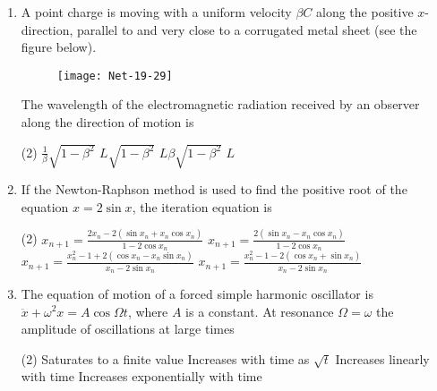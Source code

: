 \begin{enumerate}
 \begin{tasks}(4)
	\task[\textbf{a.}]$-2 \alpha$ and $\alpha$
	\task[\textbf{b.}] $2 \alpha$ and $-\alpha$
	\task[\textbf{c.}] $\alpha$ and $-2 \alpha$
	\task[\textbf{d.}] $-\alpha$ and $2 \alpha$
\end{tasks}
\item  A point charge is moving with a uniform velocity $\beta C$ along the positive $x$-direction, parallel to and very close to a corrugated metal sheet (see the figure below).
\begin{figure}[H]
	\centering
	\texttt{[image: Net-19-29]}
\end{figure}
The wavelength of the electromagnetic radiation received by an observer along the direction of motion is
 \begin{tasks}(2)
	\task[\textbf{a.}]$\frac{1}{\beta} \sqrt{1-\beta^{2}}$
	\task[\textbf{b.}]$L \sqrt{1-\beta^{2}}$
	\task[\textbf{c.}]$L \beta \sqrt{1-\beta^{2}}$
	\task[\textbf{d.}] $L$
\end{tasks}
\item If the Newton-Raphson method is used to find the positive root of the equation $x=2 \sin x$, the iteration equation is
 \begin{tasks}(2)
	\task[\textbf{a.}]$x_{n+1}=\frac{2 x_{n}-2\left(\sin x_{n}+x_{n} \cos x_{n}\right)}{1-2 \cos x_{n}}$
	\task[\textbf{b.}]$x_{n+1}=\frac{2\left(\sin x_{n}-x_{n} \cos x_{n}\right)}{1-2 \cos x_{n}}$
	\task[\textbf{c.}] $x_{n+1}=\frac{x_{n}^{2}-1+2\left(\cos x_{n}-x_{n} \sin x_{n}\right)}{x_{n}-2 \sin x_{n}}$
	\task[\textbf{d.}]  $x_{n+1}=\frac{x_{n}^{2}-1-2\left(\cos x_{n}+\sin x_{n}\right)}{x_{n}-2 \sin x_{n}}$
\end{tasks}
\item  The equation of motion of a forced simple harmonic oscillator is $\ddot{x}+\omega^{2} x=A \cos \Omega t$, where $A$ is a constant. At resonance $\Omega=\omega$ the amplitude of oscillations at large times
 \begin{tasks}(2)
	\task[\textbf{a.}]Saturates to a finite value
	\task[\textbf{b.}]Increases with time as $\sqrt{t}$
	\task[\textbf{c.}]Increases linearly with time
	\task[\textbf{d.}]Increases exponentially with time
\end{tasks}

\end{enumerate}

